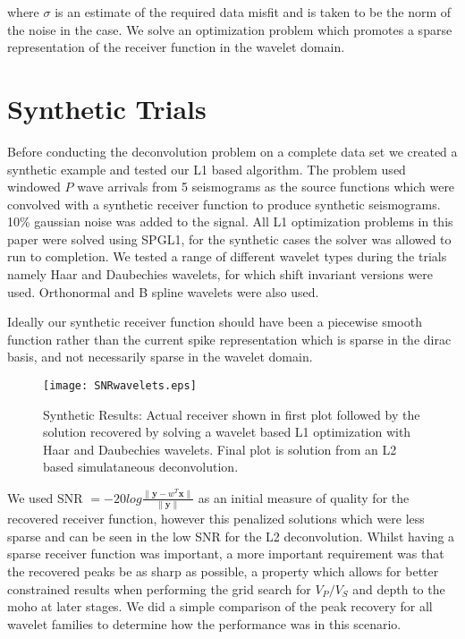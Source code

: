 \documentclass[jgrga]{agutex}
\begin{document}
\begin{article}
where $\sigma$ is an estimate of the required data misfit and is taken to be the norm of the noise in the case. We solve an optimization problem which promotes a sparse representation of the receiver function in the wavelet domain. 

\section{Synthetic Trials}

Before conducting the deconvolution problem on a complete data set we created a synthetic example and tested our L1 based algorithm. The problem used windowed $P$ wave arrivals from 5 seismograms as the source functions which were convolved with a synthetic receiver function to produce synthetic seismograms. 10\% gaussian noise was added to the signal. All L1 optimization problems in this paper were solved using SPGL1, for the synthetic cases the solver was allowed to run to completion. We tested a range of different wavelet types during the trials namely Haar and Daubechies wavelets, for which shift invariant versions were used. Orthonormal and B spline wavelets were also used. 


Ideally our synthetic receiver function should have been a piecewise smooth function rather than the current spike representation which is sparse in the dirac basis, and not necessarily sparse in the wavelet domain. 

\begin{figure}
\noindent\texttt{[image: SNRwavelets.eps]}
\caption{Synthetic Results: Actual receiver shown in first plot followed by the solution recovered by solving a wavelet based L1 optimization with Haar and Daubechies wavelets. Final plot is solution from an L2 based simulataneous deconvolution.}
\end{figure}


We used SNR $= -20 log \frac{\lVert \textbf{y} - \textit{w}^{T}\textbf{x} \rVert}{\lVert \textbf{y} \rVert}$ as an initial measure of quality for the recovered receiver function, however this penalized solutions which were less sparse and can be seen in the low SNR for the L2 deconvolution. Whilst having a sparse receiver function was important, a more important requirement was that the recovered peaks be as sharp as possible, a property which allows for better constrained results when performing the grid search for $V_{P}/V_{S}$ and depth to the moho at later stages. We did a simple comparison of the peak recovery for all wavelet families to determine how the performance was in this scenario. 


\end{article}
\end{document}
